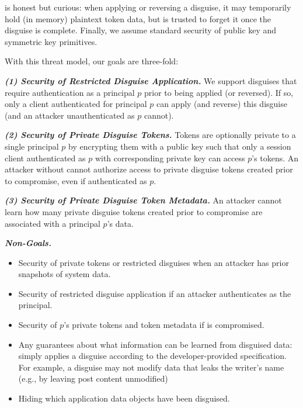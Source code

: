 \sys is honest but curious: when applying or reversing a disguise, it may temporarily
hold (in memory) plaintext token data, but is trusted to forget it once the disguise is complete.
Finally, we assume standard security of public key and symmetric key primitives.

With this threat model, our goals are three-fold: 

\vspace{6pt}\noindent\textbf{\emph{(1) Security of Restricted Disguise Application.}}
We support disguises that require authentication as a principal $p$ prior to being
applied (or reversed). If so, only a client authenticated for principal $p$ can apply (and reverse) this disguise (and an attacker unauthenticated as $p$ cannot).

\vspace{6pt}\noindent\textbf{\emph{(2) Security of Private Disguise Tokens.}}
Tokens are optionally private to a single principal $p$ by encrypting them with a public key
 such that only a session client authenticated as $p$ with corresponding private key  can access $p$'s tokens. 
An attacker without  cannot authorize access to private disguise tokens created prior to compromise, even if authenticated as $p$.

\vspace{6pt}\noindent\textbf{\emph{(3) Security of Private Disguise Token Metadata.}}
An attacker cannot learn how many private disguise tokens created prior to compromise are associated with a principal $p$'s data.

\vspace{6pt}\noindent\textbf{\emph{Non-Goals.}}
\begin{itemize}
    \item Security of private tokens or restricted disguises when an attacker has prior snapshots of system data.
    \item Security of restricted disguise application if an attacker authenticates as the principal.
    \item Security of $p$'s private tokens and token metadata if  is compromised.  
    \item Any guarantees about what information can be learned from disguised data: \sys 
        simply applies a disguise according to the developer-provided specification. 
        For example, a disguise may not modify data that leaks the writer's name (e.g., by leaving post content unmodified)
    \item Hiding which application data objects have been disguised.
\end{itemize}


